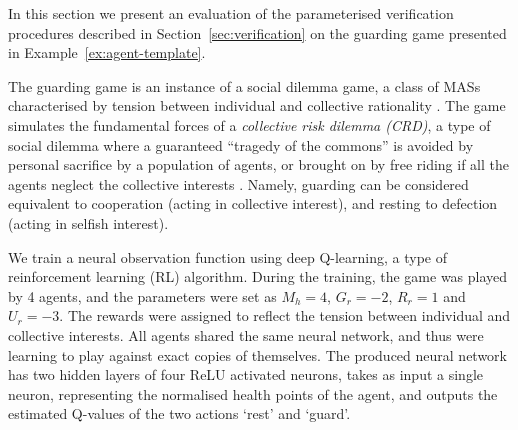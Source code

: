 
In this section we present an evaluation of the parameterised verification
procedures described in Section~\ref{sec:verification} on the guarding game
presented in Example~\ref{ex:agent-template}.


The guarding game is an instance of a social dilemma game, a class of
MASs characterised by tension between individual
and collective rationality \cite{VanlangeJPV13}. The  game simulates
the fundamental forces of a \emph{collective risk dilemma (CRD)}, a type of
social dilemma where a guaranteed ``tragedy of the commons''
\cite{Hardin68} is avoided by personal sacrifice by a population of
agents, or brought on by free riding if all the agents %
neglect the collective interests %
\cite{SantosP11}.
%
Namely, guarding can be considered equivalent to cooperation (acting in
collective interest), and resting to defection (acting in selfish
interest).


We train a neural observation function using deep Q-learning, a type of
reinforcement learning (RL) algorithm. During the training, the game was played
by 4 agents, and the parameters were set as $M_h = 4$, $G_r = -2$, $R_r = 1$
and $U_r = -3$. The rewards were assigned to reflect the tension between
individual and collective interests. All agents shared the same neural network,
and thus
were learning to play against exact copies of themselves.
%
%
The produced neural network has two hidden layers of four ReLU activated
neurons, takes as input a single neuron, representing the normalised health
points of the agent, and outputs the estimated Q-values of the two actions
`rest' and `guard'.



